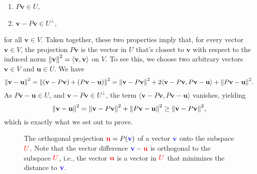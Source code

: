 \begin{enumerate}
    \item $P \mathbf{v} \in U$,

    \item $\mathbf{v} - P \mathbf{v} \in U^{\bot}$,
\end{enumerate}
for all $\mathbf{v} \in V$. Taken together, these two properties imply that, for every vector $\mathbf{v} \in V$, the projection $P \mathbf{v}$ is the vector in $U$ that's closest to $\mathbf{v}$ with respect to the induced norm $\norm{\mathbf{v}}^2 = \langle \mathbf{v}, \mathbf{v} \rangle$ on $V$. To see this, we choose two arbitrary vectors $\mathbf{v} \in V$ and $\mathbf{u} \in U$. We have
\[
    \norm{\mathbf{v} - \mathbf{u}}^2 = \norm{(\mathbf{v} - P \mathbf{v}) + (P \mathbf{v} - \mathbf{u})}^2 = \norm{\mathbf{v} - P \mathbf{v}}^2 + 2 \langle \mathbf{v} - P \mathbf{v}, P \mathbf{v} - \mathbf{u} \rangle + \norm{P \mathbf{v} - \mathbf{u}}^2.
\]
As $P \mathbf{v} - \mathbf{u} \in U$, and $\mathbf{v} - P \mathbf{v} \in U^{\bot}$, the term $\langle \mathbf{v} - P \mathbf{v}, P \mathbf{v} - \mathbf{u} \rangle$ vanishes, yielding
\[
    \norm{\mathbf{v} - \mathbf{u}}^2  = \norm{\mathbf{v} - P \mathbf{v}}^2 + \norm{P \mathbf{v} - \mathbf{u}}^2 \geq \norm{\mathbf{v} - P \mathbf{v}}^2,
\]
which is exactly what we set out to prove.

\begin{figure}
    \centering
    \caption{%
         The orthogonal projection ${\color{red} \mathbf{u}} = P({\color{blue} \mathbf{v}})$ of a vector ${\color{blue} \mathbf{v}}$ onto the subspace ${\color{red} U}$. Note that the vector difference ${\color{blue} \mathbf{v}} - {\color{red} \mathbf{u}}$ is orthogonal to the subspace ${\color{red} U}$, i.e., the vector ${\color{red} \mathbf{u}}$ is a vector in ${\color{red} U}$ that minimizes the distance to ${\color{blue} \mathbf{v}}$.
    }
    \label{fig: orthogonal projection}
\end{figure}


